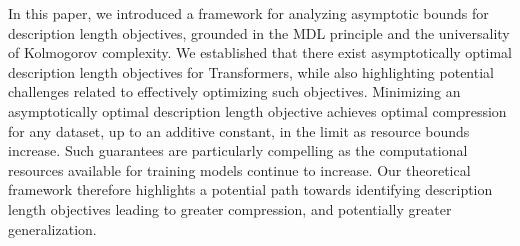 In this paper, we introduced a framework for analyzing asymptotic bounds for description length objectives, grounded in the MDL principle and the universality of Kolmogorov complexity. We established that there exist asymptotically optimal description length objectives for Transformers, while also highlighting potential challenges related to effectively optimizing such objectives. %
Minimizing an asymptotically optimal description length objective achieves optimal compression for any dataset, up to an additive constant, in the limit as resource bounds increase. Such guarantees are particularly compelling as the computational resources available for training models continue to increase. 
Our theoretical framework therefore highlights a potential path towards identifying description length objectives leading to greater compression, and potentially greater generalization.


